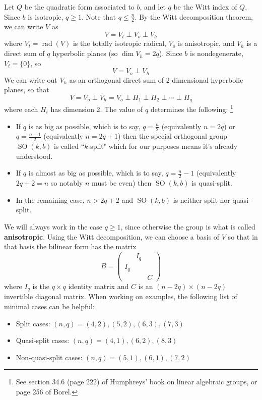 \documentclass[12pt]{article}
\theoremstyle{definition}
\newcommand{\tbf}{\textbf}
\DeclareMathOperator{\SO}{SO}
\DeclareMathOperator{\rad}{rad}
\begin{document}
Let $Q$ be the quadratic form associated to $b$, and let $q$ be the Witt index of $Q$. Since $b$ is isotropic, $q \ge 1$. Note that $q \le \frac{n}{2}$. By the Witt decomposition theorem, we can write $V$ as 
\[
	V = V_t \perp V_o \perp V_h
\]
where $V_t = \rad(V)$ is the totally isotropic radical, $V_o$ is anisotropic, and $V_h$ is a direct sum of $q$ hyperbolic planes (so $\dim V_h = 2q$). Since $b$ is nondegenerate, $V_t = \{0\}$, so
\[
	V = V_o \perp V_h
\]
We can write out $V_h$ as an orthogonal direct sum of 2-dimensional hyperbolic planes, so that
\[
	V = V_o \perp V_h = V_o \perp H_1 \perp H_2 \perp \cdots \perp H_q
\]
where each $H_i$ has dimension 2. The value of $q$ determines the following: \footnote{See section 34.6 (page 222) of Humphreys' book on linear algebraic groups, or page 256 of Borel.}
\begin{itemize}
	\item If $q$ is as big as possible, which is to say, $q = \frac{n}{2}$ (equivalently $n=2q$) or $q = \frac{n-1}{2}$ (equivalently $n=2q+1$) then the special orthogonal group $\SO(k,b)$ is called ``$k$-split" which for our purposes means it's already understood.
	\item If $q$ is almost as big as possible, which is to say, $q = \frac{n}{2} - 1$ (equivalently $2q + 2 = n$ so notably $n$ must be even) then $\SO(k,b)$ is quasi-split.
	\item In the remaining case, $n > 2q+2$ and $\SO(k,b)$ is neither split nor quasi-split.
\end{itemize}
We will always work in the case $q \ge 1$, since otherwise the group is what is called \tbf{anisotropic}. Using the Witt decomposition, we can choose a basis of $V$ so that in that basis the bilinear form has the matrix
\[
	B =
	\begin{pmatrix}
		& I_q \\
		I_q \\
		&& C
	\end{pmatrix}
\]
where $I_q$ is the $q \times q$ identity matrix and $C$ is an $(n-2q) \times (n-2q)$ invertible diagonal matrix. When working on examples, the following list of minimal cases can be helpful:
\begin{itemize}
	\item Split cases: $(n,q) = (4,2), (5,2), (6, 3), (7,3)$
	\item Quasi-split cases: $(n,q) = (4,1), (6,2), (8,3)$
	\item Non-quasi-split cases:   $(n,q) = (5, 1), (6,1), (7,2)$
\end{itemize}
\end{document}
